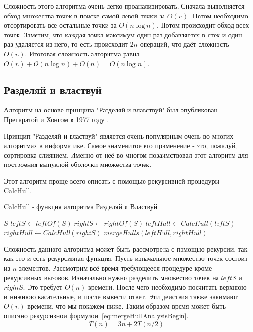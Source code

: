 Сложность этого алгоритма очень легко проанализировать. Сначала выполняется обход множества точек в поиске самой левой точки за $O(n)$. Потом необходимо отсортировать все остальные точки за $O(n \log n)$. Потом происходит обход всех точек. Заметим, что каждая точка максимум один раз добавляется в стек и один раз удаляется из него, то есть происходит $2n$ операций, что даёт сложность $O(n)$. Итоговая сложность алгоритма равна $O(n) + O(n \log n) + O(n) = O(n \log n)$.

\subsection{Разделяй и властвуй} \label{subsect1_1_3}

Алгоритм на основе принципа "Разделяй и влавствуй" был опубликован Препаратой и Хонгом в 1977 году \cite{preparata1977DivideAndConquer}.

Принцип "Разделяй и властвуй" является очень популярным очень во многих алгоритмах в информатике. Самое знаменитое его применение - это, пожалуй, сортировка слиянием. Именно от неё во многом позаимствовал этот алгоритм для построения выпуклой оболочки множества точек.

Этот алгоритм проще всего описать с помощью рекурсивной процедуры CalcHull.

\begin{algorithm}[H]
	\caption{CalcHull - функция алгоритма Разделяй и Властвуй}
	\begin{algorithmic}[1]
			\Return $S$
		\EndIf
		\State $leftS\gets leftOf(S)$ 
		\State $rightS\gets rightOf(S)$ 
		\State $leftHull\gets CalcHull(leftS)$
		\State $rightHull\gets CalcHull(rightS)$
		\State
		\Return $mergeHulls(leftHull, rightHull)$
		\EndProcedure
	\end{algorithmic}
\end{algorithm}

Сложность данного алгоритма может быть рассмотрена с помощью рекурсии, так как это и есть рекурсивная функция. Пусть изначальное множество точек состоит из $n$ элементов. Рассмотрим всё время требующееся процедуре кроме рекурсивных вызовов. Изначально нужно разделить множество точек на $leftS$ и $rightS$. Это требует $O(n)$ времени. После чего необходимо посчитать верхнюю и нижнюю касательные, и после вывести ответ. Эти действия также занимают $O(n)$ времени, что мы покажем ниже. Таким образом время может быть описано рекурсивной формулой~\ref{eq:mergeHullAnalysisBegin}.
\begin{equation}\label{eq:mergeHullAnalysisBegin}
T(n) = 3n + 2T(n/2)
\end{equation}


